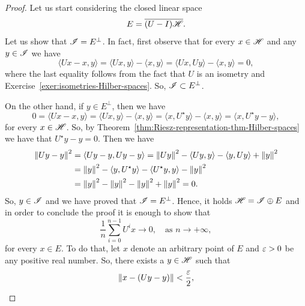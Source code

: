 \begin{proof}
  Let us start considering the closed linear space
  \begin{displaymath}
    E=\overline{(U-I)\mathscr{H}}.
  \end{displaymath}
  Let us show that $\mathscr{I}=E^{\perp}$. In fact, first observe that for every $x\in\mathscr{H}$ and any $y\in\mathscr{I}$ we have
  \begin{displaymath}
    \langle Ux-x,y\rangle = \langle Ux,y\rangle - \langle x,y\rangle = \langle Ux, Uy\rangle - \langle x,y\rangle =0,
  \end{displaymath}
  where the last equality follows from the fact that $U$ is an isometry and Exercise~\ref{exer:isometries-Hilber-spaces}. So, $\mathscr{I}\subset E^{\perp}$.

  On the other hand, if $y\in E^{\perp}$, then we have
  \begin{displaymath}
    0=\langle Ux-x,y\rangle = \langle Ux,y\rangle - \langle x,y\rangle = \langle x, U^{\star} y\rangle - \langle x,y\rangle = \langle x, U^{\star}y-y\rangle,
  \end{displaymath}
  for every $x\in\mathscr{H}$. So, by Theorem~\ref{thm:Riesz-representation-thm-Hilber-spaces} we have that $U^{\star}y-y=0$. Then we have
  \begin{displaymath}
    \begin{split}
      \left\|{Uy-y}\right\|^{2} &= \langle Uy-y,Uy-y\rangle = \left\|{Uy}\right\|^{2} - \langle Uy,y\rangle - \langle y,Uy\rangle + \left\|{y}\right\|^{2} \\
                      &= \left\|{y}\right\|^{2} - \langle y,U^{\star}y\rangle - \langle U^{\star} y,y\rangle - \left\|{y}\right\|^{2} \\
      & = \left\|{y}\right\|^{2} - \left\|{y}\right\|^{2} - \left\|{y}\right\|^{2} +\left\|{y}\right\|^{2} = 0.
    \end{split}
  \end{displaymath}
  So, $y\in\mathscr{I}$ and we have proved that $\mathscr{I}=E^{\perp}$. Hence, it holds $\mathscr{H}=\mathscr{I}\oplus E$ and in order to conclude the proof it is enough to show that
  \begin{equation}
    \label{eq:zero-Birkhoff-averages-limit-for-almost-coboundaries}
    \frac{1}{n}\sum_{i=0}^{n-1} U^{i}x\to 0, \quad\text{as } n\to+\infty,
  \end{equation}
  for every $x\in E$. To do that, let $x$ denote an arbitrary point of $E$ and $\varepsilon>0$ be any positive real number. So, there exists a $y\in\mathscr{H}$ such that
  \begin{displaymath}
    \left\|{x- (Uy-y)}\right\|<\frac{\varepsilon}{2},
  \end{displaymath}

\end{proof}
